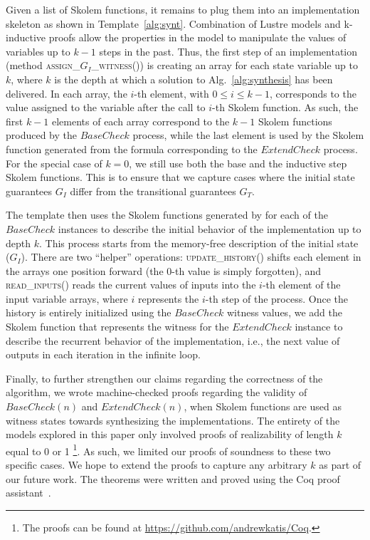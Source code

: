 Given a list of Skolem functions, it remains to plug them into
an implementation skeleton as shown in Template~\ref{alg:synt}. 
Combination of Lustre models and k-inductive proofs
allow the properties in the model to manipulate the
 values of variables up to $k-1$ steps in the past. Thus,
the first step of an implementation  (method \textsc{assign\_$G_{I}$\_witness()})
 is creating an array for each state variable up to $k$, where
$k$ is the depth at which a solution to Alg.~\ref{alg:synthesis} has been delivered.
In each array, the $i$-th element, with $0\leq i \leq k-1$,
corresponds to the value assigned to the variable after the call to
$i$-th Skolem function. As such, the first $k-1$ elements of each array
correspond to the $k-1$ Skolem functions produced by the
$\mathit{BaseCheck}$ process, while the last element is used by the
Skolem function generated from the formula corresponding to the
$\mathit{ExtendCheck}$ process. For the special case of $k=0$, we still use
both the base and the inductive step Skolem functions.
This is to ensure that we capture cases where the initial state guarantees $G_I$ differ from the
transitional guarantees $G_T$.

The template then uses the Skolem functions generated by \aeval for each
of the $\mathit{BaseCheck}$ instances to describe the initial behavior of
the implementation up to depth $k$.  This process starts from the memory-free
description of the initial state ($G_I$).
There are two ``helper'' operations:
\textsc{update\_history()} shifts each element in the arrays one position
forward (the 0-th value is simply forgotten), and \textsc{read\_inputs()} reads the
current values of inputs into the $i$-th element of the input variable arrays,
where $i$ represents the $i$-th step of the process.
Once the history is entirely initialized using the $\mathit{BaseCheck}$ witness values,
we add the Skolem function that represents the witness for the
$\mathit{ExtendCheck}$ instance to describe the recurrent behavior of the implementation, i.e.,
the next value of outputs in each iteration in the infinite loop.

Finally, to further strengthen our claims regarding the correctness of the algorithm,
we wrote machine-checked proofs regarding the validity of $\mathit{BaseCheck(n)}$ and
$\mathit{ExtendCheck(n)}$, when Skolem functions are used as witness states
towards synthesizing the implementations. The entirety of the models explored in
this paper only involved proofs of realizability of length $k$ equal to 0 or
1%
\footnote{The proofs can be found at \url{https://github.com/andrewkatis/Coq}.}.
As such, we limited our proofs of soundness to these two specific cases. We hope
to extend the proofs to capture any arbitrary $k$ as part of our future work.
The theorems were written and proved using the Coq proof
assistant~\cite{Coqmanual}.


